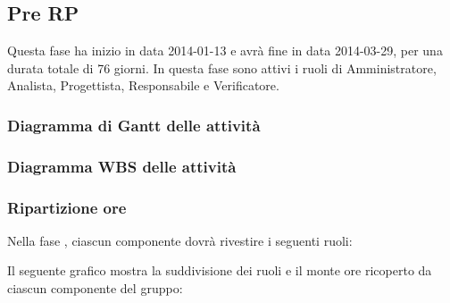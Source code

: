 \subsection{Pre RP}
Questa fase ha inizio in data 2014-01-13 e avrà fine in data 2014-03-29, per una durata totale di 76 giorni. In questa fase sono attivi i ruoli di Amministratore, Analista, Progettista, Responsabile e Verificatore.

\subsubsection{Diagramma di Gantt delle attività}

\newpage
\subsubsection{Diagramma WBS delle attività}

\newpage
\subsubsection{Ripartizione ore}

\newpage
Nella fase , ciascun componente dovrà rivestire i seguenti ruoli:

Il seguente grafico mostra la suddivisione dei ruoli e il monte ore ricoperto da ciascun componente del gruppo:

